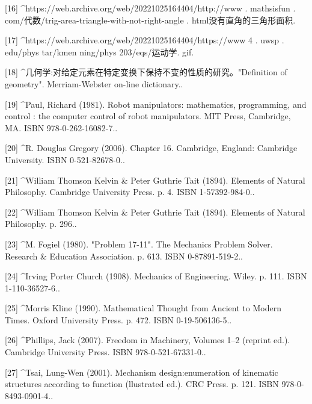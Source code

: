[16]
^https://web.archive.org/web/20221025164404/http://www . mathsisfun . com/代数/trig-area-triangle-with-not-right-angle . html没有直角的三角形面积.

[17]
^https://web.archive.org/web/20221025164404/https://www 4 . uwsp . edu/phys tar/kmen ning/phys 203/eqs/运动学. gif.

[18]
^几何学:对给定元素在特定变换下保持不变的性质的研究。"Definition of geometry". Merriam-Webster on-line dictionary..

[19]
^Paul, Richard (1981). Robot manipulators: mathematics, programming, and control : the computer control of robot manipulators. MIT Press, Cambridge, MA. ISBN 978-0-262-16082-7..

[20]
^R. Douglas Gregory (2006). Chapter 16. Cambridge, England: Cambridge University. ISBN 0-521-82678-0..

[21]
^William Thomson Kelvin & Peter Guthrie Tait (1894). Elements of Natural Philosophy. Cambridge University Press. p. 4. ISBN 1-57392-984-0..

[22]
^William Thomson Kelvin & Peter Guthrie Tait (1894). Elements of Natural Philosophy. p. 296..

[23]
^M. Fogiel (1980). "Problem 17-11". The Mechanics Problem Solver. Research & Education Association. p. 613. ISBN 0-87891-519-2..

[24]
^Irving Porter Church (1908). Mechanics of Engineering. Wiley. p. 111. ISBN 1-110-36527-6..

[25]
^Morris Kline (1990). Mathematical Thought from Ancient to Modern Times. Oxford University Press. p. 472. ISBN 0-19-506136-5..

[26]
^Phillips, Jack (2007). Freedom in Machinery, Volumes 1–2 (reprint ed.). Cambridge University Press. ISBN 978-0-521-67331-0..

[27]
^Tsai, Lung-Wen (2001). Mechanism design:enumeration of kinematic structures according to function (llustrated ed.). CRC Press. p. 121. ISBN 978-0-8493-0901-4..